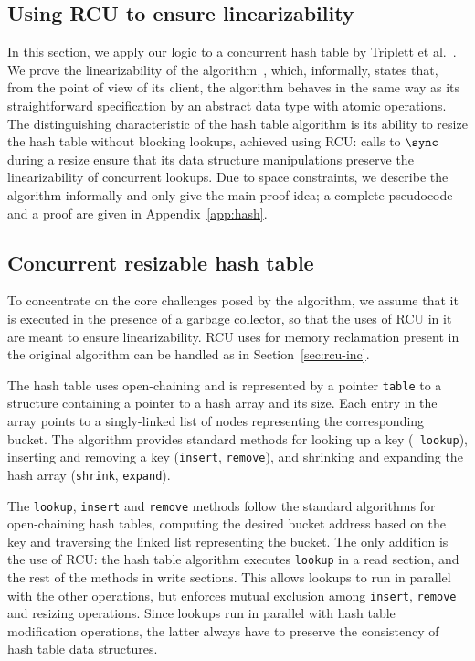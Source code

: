 \subsection{Using RCU to ensure linearizability\label{sec:rcu-hash}}

In this section, we apply our logic to a concurrent hash table by Triplett et
al.~\cite{hashtable}. We prove the linearizability of the
algorithm~\cite{linearizability}, which, informally, states that, from the point
of view of its client, the algorithm behaves in the same way as its
straightforward specification by an abstract data type with atomic operations.
The distinguishing characteristic of the hash table algorithm is its ability to
resize the hash table without blocking lookups, achieved using RCU: calls to
$\sync$ during a resize ensure that its data structure manipulations preserve the
linearizability of concurrent lookups. Due to space constraints, we describe the
algorithm informally and only give the main proof idea; a complete pseudocode
and a proof are given in Appendix~\ref{app:hash}.

\subsection{Concurrent resizable hash table}

To concentrate on the core challenges posed by the algorithm, we assume that it
is executed in the presence of a garbage collector, so that the uses of RCU
in it are meant to ensure linearizability. RCU uses for memory reclamation
present in the original algorithm can be handled as in Section~\ref{sec:rcu-inc}.

The hash table uses open-chaining and is represented by a pointer {\tt table} to
a structure containing a pointer to a hash array and its size. Each entry in
the array points to a singly-linked list of nodes representing the corresponding
bucket. The algorithm provides standard methods for looking up a key ({\tt
  lookup}), inserting and removing a key ({\tt insert}, {\tt remove}), and
shrinking and expanding the hash array ({\tt shrink}, {\tt expand}).

The {\tt lookup}, {\tt insert} and {\tt remove} methods follow the standard
algorithms for open-chaining hash tables, computing the desired bucket address
based on the key and traversing the linked list representing the bucket.  The
only addition is the use of RCU: the hash table algorithm executes {\tt lookup}
in a read section, and the rest of the methods in write sections. This allows
lookups to run in parallel with the other operations, but enforces mutual
exclusion among {\tt insert}, {\tt remove} and resizing operations. 
Since lookups run in parallel with hash table modification operations, the
latter always have to preserve the consistency of hash table data structures.

